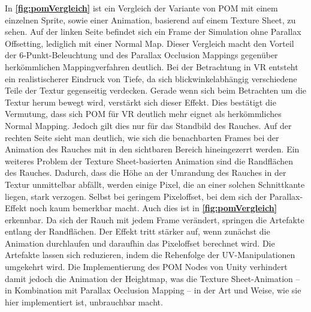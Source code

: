 In \textbf{\autoref{fig:pomVergleich}} ist ein Vergleich der Variante von POM mit einem einzelnen Sprite, sowie einer Animation, basierend auf einem Texture Sheet, zu sehen. 
Auf der linken Seite befindet sich ein Frame der Simulation ohne Parallax Offsetting, lediglich mit einer Normal Map. Dieser Vergleich macht den Vorteil der 6-Punkt-Beleuchtung und 
des Parallax Occlusion Mappings gegenüber herkömmlichen Mappingverfahren deutlich. 
Bei der Betrachtung in VR entsteht ein realistischerer Eindruck von Tiefe, da sich blickwinkelabhängig verschiedene Teile der Textur gegenseitig verdecken. Gerade wenn sich beim Betrachten
um die Textur herum bewegt wird, verstärkt sich dieser Effekt.  
Dies bestätigt die Vermutung, dass sich POM für VR deutlich mehr eignet als herkömmliches Normal Mapping. Jedoch gilt dies nur für das Standbild des Rauches.
Auf der rechten Seite sieht man deutlich, wie sich die benachbarten Frames bei der Animation des Rauches mit in den sichtbaren Bereich hineingezerrt werden.
Ein weiteres Problem der Texture Sheet-basierten Animation sind die Randflächen des Rauches. Dadurch, dass die Höhe an der Umrandung des Rauches in der Textur unmittelbar abfällt,
werden einige Pixel, die an einer solchen Schnittkante liegen, stark verzogen. Selbst bei geringem Pixeloffset, bei dem sich der Parallax-Effekt noch kaum bemerkbar macht. 
Auch dies ist in \textbf{\autoref{fig:pomVergleich}} erkennbar. Da sich der Rauch mit jedem Frame verändert, springen
die Artefakte entlang der Randflächen. Der Effekt tritt stärker auf, wenn zunächst die Animation durchlaufen und daraufhin das Pixeloffset berechnet wird. Die Artefakte lassen sich 
reduzieren, indem die Rehenfolge der UV-Manipulationen umgekehrt wird. Die Implementierung des POM Nodes von Unity verhindert damit jedoch die Animation der Heightmap, was 
die Texture Sheet-Animation – in Kombination mit Parallax Occlusion Mapping – in der Art und Weise, wie sie hier implementiert ist, unbrauchbar macht. 

